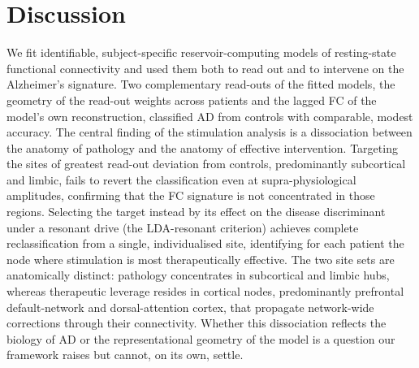 \documentclass[11pt]{article}
\begin{document}
\section*{Discussion}
We fit identifiable, subject-specific reservoir-computing models of
resting-state functional connectivity and used them both to read out and to
intervene on the Alzheimer's signature. Two complementary read-outs of the
fitted models, the geometry of the read-out weights across patients and the
lagged FC of the model's own reconstruction, classified AD from controls with
comparable, modest accuracy. The central finding of the stimulation analysis is
a dissociation between the anatomy of pathology and the anatomy of effective
intervention. Targeting the sites of greatest read-out deviation from controls, 
predominantly subcortical and limbic, fails to revert the classification even at
supra-physiological amplitudes, confirming that the FC signature is not
concentrated in those regions. Selecting the target instead by its effect on the
disease discriminant under a resonant drive (the LDA-resonant criterion) achieves
complete reclassification from a single, individualised site, identifying for each
patient the node where stimulation is most therapeutically effective. The two site
sets are anatomically distinct: pathology concentrates in subcortical and limbic
hubs, whereas therapeutic leverage resides in cortical nodes, predominantly
prefrontal default-network and dorsal-attention cortex, that propagate network-wide
corrections through their connectivity. Whether this dissociation reflects the
biology of AD or the representational geometry of the model is a question our
framework raises but cannot, on its own, settle.
\end{document}
